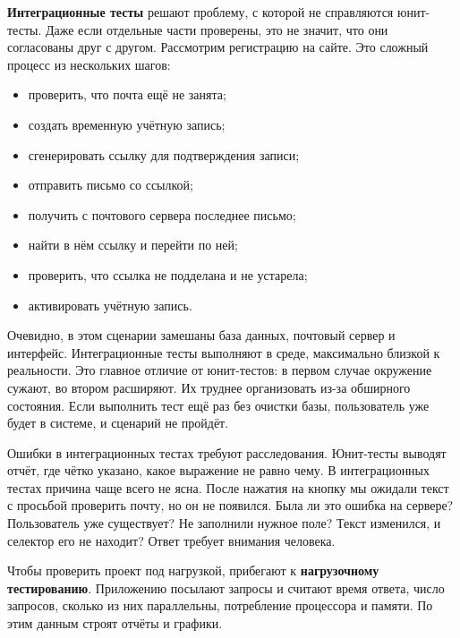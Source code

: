 
\textbf{Интеграционные тесты} решают проблему, с которой не справляются
юнит-тесты. Даже если отдельные части проверены, это не значит, что они
согласованы друг с другом. Рассмотрим регистрацию на сайте. Это сложный процесс
из нескольких шагов:

\begin{itemize}

\item
  проверить, что почта ещё не занята;

\item
  создать временную учётную запись;

\item
  сгенерировать ссылку для подтверждения записи;

\item
  отправить письмо со ссылкой;

\item
  получить с почтового сервера последнее письмо;

\item
  найти в нём ссылку и перейти по ней;

\item
  проверить, что ссылка не подделана и не устарела;

\item
  активировать учётную запись.

\end{itemize}

Очевидно, в этом сценарии замешаны база данных, почтовый сервер и интерфейс.
Интеграционные тесты выполняют в среде, максимально близкой к реальности. Это
главное отличие от юнит-тестов: в первом случае окружение сужают, во втором
расширяют. Их труднее организовать из-за обширного состояния. Если выполнить
тест ещё раз без очистки базы, пользователь уже будет в системе, и сценарий не
пройдёт.

Ошибки в интеграционных тестах требуют расследования. Юнит-тесты выводят отчёт,
где чётко указано, какое выражение не равно чему. В интеграционных тестах
причина чаще всего не ясна. После нажатия на кнопку мы ожидали текст с просьбой
проверить почту, но он не появился. Была ли это ошибка на сервере? Пользователь
уже существует? Не заполнили нужное поле? Текст изменился, и селектор его не
находит? Ответ требует внимания человека.


Чтобы проверить проект под нагрузкой, прибегают к \textbf{нагрузочному тестированию}.
Приложению посылают запросы и считают время ответа, число запросов, сколько
из них параллельны, потребление процессора и памяти. По этим данным строят
отчёты и графики.

